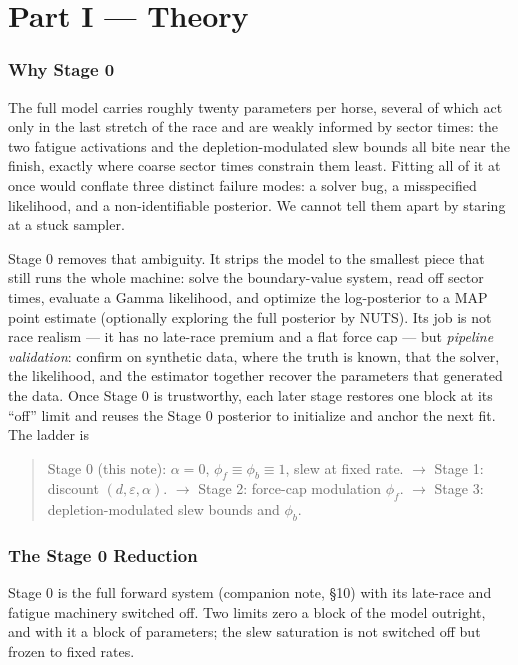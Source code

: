 \documentclass[11pt]{article}
\begin{document}
\tableofcontents
\newpage

\part*{Part I --- Theory}

\section{Why Stage 0}

The full model carries roughly twenty parameters per horse, several of which act only in the last stretch of the race and are weakly informed by sector times: the two fatigue activations and the depletion-modulated slew bounds all bite near the finish, exactly where coarse sector times constrain them least. Fitting all of it at once would conflate three distinct failure modes: a solver bug, a misspecified likelihood, and a non-identifiable posterior. We cannot tell them apart by staring at a stuck sampler.

Stage 0 removes that ambiguity. It strips the model to the smallest piece that still runs the whole machine: solve the boundary-value system, read off sector times, evaluate a Gamma likelihood, and optimize the log-posterior to a MAP point estimate (optionally exploring the full posterior by NUTS). Its job is not race realism --- it has no late-race premium and a flat force cap --- but \emph{pipeline validation}: confirm on synthetic data, where the truth is known, that the solver, the likelihood, and the estimator together recover the parameters that generated the data. Once Stage 0 is trustworthy, each later stage restores one block at its ``off'' limit and reuses the Stage 0 posterior to initialize and anchor the next fit. The ladder is

\begin{quote}
Stage 0 (this note): $\alpha = 0$, $\phi_f \equiv \phi_b \equiv 1$, slew at fixed rate. \;$\to$\;
Stage 1: discount $(d, \varepsilon, \alpha)$. \;$\to$\;
Stage 2: force-cap modulation $\phi_f$. \;$\to$\;
Stage 3: depletion-modulated slew bounds and $\phi_b$.
\end{quote}

\section{The Stage 0 Reduction}

Stage 0 is the full forward system (companion note, \S10) with its late-race and fatigue machinery switched off. Two limits zero a block of the model outright, and with it a block of parameters; the slew saturation is not switched off but frozen to fixed rates.
\end{document}
